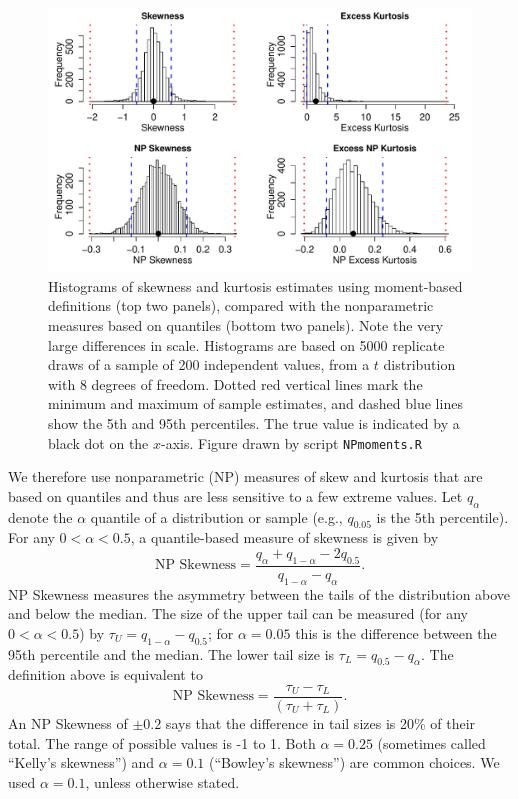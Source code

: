 \documentclass[12pt]{article}
\newcounter{box}
\newcommand{\be}{\begin{equation}}
\newcommand{\ee}{\end{equation}}
\begin{document}
\begin{figure}[tbp]
\centering
\includegraphics[width=\textwidth]{figures/NPmoments.pdf}
\caption{Histograms of skewness and kurtosis estimates using moment-based definitions (top two panels), compared with the nonparametric measures based on quantiles (bottom two panels). 
Note the very large differences in scale. Histograms are based on 5000 replicate draws 
of a sample of 200 independent values, from a $t$ distribution with 8 degrees of freedom. 
Dotted red vertical lines mark the minimum and maximum of sample estimates, and dashed blue lines show the 5th and 95th percentiles. 
The true value is indicated by a black dot on the $x$-axis.
Figure drawn by script \texttt{NPmoments.R}}
\label{fig:NPmoments}
\end{figure} 

We therefore use nonparametric (NP) measures of skew and kurtosis that are based on quantiles and thus are less sensitive to a few extreme values. 
Let $q_\alpha$ denote the $\alpha$ quantile of a distribution or sample (e.g., $q_{0.05}$ is the 5th percentile). 
For any $0 < \alpha < 0.5$, a quantile-based measure of skewness is given by \citep{mcgillivray-1986}
\be
\mbox{NP Skewness} = \frac{q_\alpha + q_{1-\alpha} - 2 q_{0.5}}{q_{1-\alpha} - q_\alpha}.
\ee
NP Skewness measures the asymmetry between the tails of the distribution above and below the median. 
The size of the upper tail can be measured (for any $0 < \alpha < 0.5$) by $\tau_U = q_{1-\alpha} - q_{0.5}$; for $\alpha=0.05$ this is the difference
between the 95th percentile and the median. 
The lower tail size is $\tau_L = q_{0.5} - q_\alpha$. The definition above is equivalent to  
\be
\mbox{NP Skewness} = \frac{\tau_U - \tau_L}{(\tau_U + \tau_L)}.
\label{eqn:NPskew}
\ee
An NP Skewness of $\pm 0.2$ says that the difference in tail sizes is 20\% of their total. 
The range of possible values is -1 to 1. Both $\alpha=0.25$ (sometimes called ``Kelly's skewness'') and $\alpha=0.1$ (``Bowley's skewness'') are common choices. 
We used $\alpha=0.1$, unless otherwise stated.  
 
\end{document}
